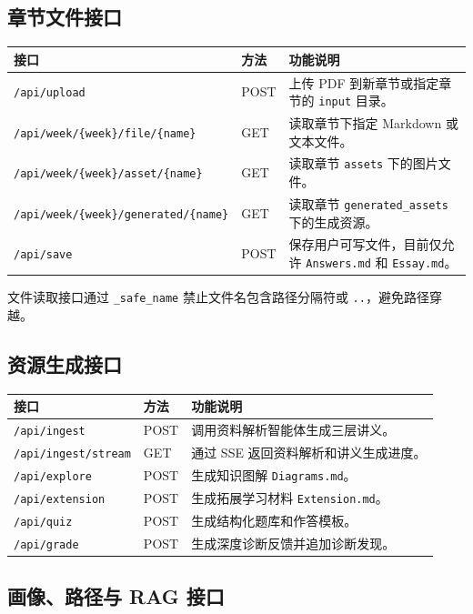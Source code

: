 \documentclass[UTF8,fontset=windows,zihao=-4,openany]{ctexrep}
\begin{document}
\subsection{章节文件接口}

\begin{longtable}{p{}p{}p{}}
\toprule
接口 & 方法 & 功能说明\\
\midrule
\texttt{/api/upload} & POST & 上传 PDF 到新章节或指定章节的 \texttt{input} 目录。\\
\texttt{/api/week/\{week\}/file/\{name\}} & GET & 读取章节下指定 Markdown 或文本文件。\\
\texttt{/api/week/\{week\}/asset/\{name\}} & GET & 读取章节 \texttt{assets} 下的图片文件。\\
\texttt{/api/week/\{week\}/generated/\{name\}} & GET & 读取章节 \texttt{generated\_assets} 下的生成资源。\\
\texttt{/api/save} & POST & 保存用户可写文件，目前仅允许 \texttt{Answers.md} 和 \texttt{Essay.md}。\\
\bottomrule
\end{longtable}

文件读取接口通过 \texttt{\_safe\_name} 禁止文件名包含路径分隔符或 \texttt{..}，避免路径穿越。

\subsection{资源生成接口}

\begin{longtable}{p{}p{}p{}}
\toprule
接口 & 方法 & 功能说明\\
\midrule
\texttt{/api/ingest} & POST & 调用资料解析智能体生成三层讲义。\\
\texttt{/api/ingest/stream} & GET & 通过 SSE 返回资料解析和讲义生成进度。\\
\texttt{/api/explore} & POST & 生成知识图解 \texttt{Diagrams.md}。\\
\texttt{/api/extension} & POST & 生成拓展学习材料 \texttt{Extension.md}。\\
\texttt{/api/quiz} & POST & 生成结构化题库和作答模板。\\
\texttt{/api/grade} & POST & 生成深度诊断反馈并追加诊断发现。\\
\bottomrule
\end{longtable}

\subsection{画像、路径与 RAG 接口}
\end{document}
